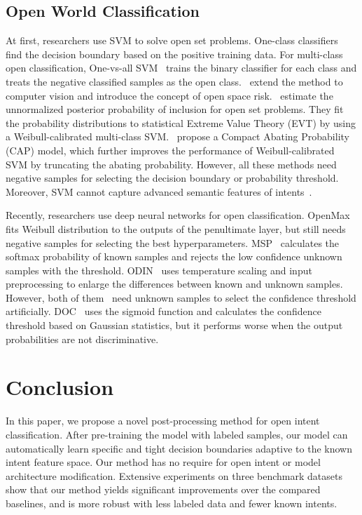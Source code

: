 \documentclass[letterpaper]{article} %
\begin{document}
\subsection{Open World Classification}
At first, researchers use SVM to solve open set problems. One-class classifiers~\cite{scholkopf2001estimating,SVDD} find the decision boundary based on the positive training data. For multi-class open classification, One-vs-all SVM~\cite{Rifkin2004In} trains the binary classifier for each class and treats the negative classified samples as the open class.~\citet{scheirer2013toward} extend the method to computer vision and introduce the concept of open space risk.~\citet{Jain_2014_ECCV} estimate the unnormalized posterior probability of inclusion for open set problems. They fit the probability distributions to statistical Extreme Value Theory (EVT) by using a Weibull-calibrated multi-class SVM.~\citet{Scheirer_2014_TPAMIb} propose a Compact Abating Probability (CAP) model, which further improves the performance of Weibull-calibrated SVM by truncating the abating probability. However, all these methods need negative samples for selecting the decision boundary or probability threshold. Moreover, SVM cannot capture  advanced semantic features of intents~\cite{lin2019post}.

Recently, researchers use deep neural networks for open classification. OpenMax~\cite{bendale2016towards} fits Weibull distribution to the outputs of the penultimate layer, but still needs negative samples for selecting the best hyperparameters. MSP~\cite{hendrycks17baseline} calculates the softmax probability of known samples and rejects the low confidence unknown samples with the threshold. ODIN~\cite{liang2018enhancing} uses temperature scaling and input preprocessing to enlarge the differences between known and unknown samples. However, both of them~\cite{hendrycks17baseline,liang2018enhancing} need unknown samples to select the confidence threshold  artificially. DOC~\cite{Shu2017DOCDO} uses the sigmoid function and calculates the confidence threshold based on Gaussian statistics, but it performs worse when the output probabilities are not discriminative.

\vspace{-1.68mm}
\section{Conclusion}
In this paper, we propose a novel post-processing method for open intent classification. After pre-training the model with labeled samples, our model can automatically learn specific and tight decision boundaries adaptive to the known intent feature space. Our method has no require for open intent or model architecture modification. Extensive experiments on three benchmark datasets show that our method yields significant improvements over the compared baselines, and is more robust with less labeled data and fewer known intents.
\end{document}
